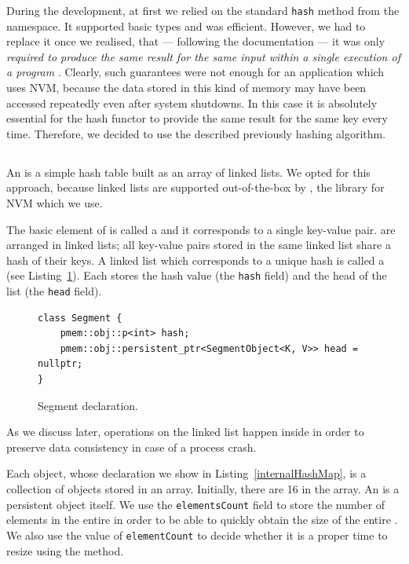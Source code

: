     During the development, at first we relied on the standard \texttt{hash} method from the \std namespace. It supported basic \std types and was efficient.
    However, we had to replace it once we realised, that --- following the documentation --- it was only \textit{required to produce the same result for the same input within a single execution of a program} \cite{StdHash}.
    Clearly, such guarantees were not enough for an application which uses NVM, because the data stored in this kind of memory may have been accessed repeatedly even after system shutdowns. In this case it is absolutely essential for the hash functor to provide the same result for the same key every time.    
    Therefore, we decided to use the described previously hashing algorithm.

\subsection{\internalHashMap}

    An \internalHashMap is a simple hash table built as an array of linked lists.
    We opted for this approach, because linked lists are supported out-of-the-box by \libpmemobj, the library for NVM which we use. 
    
    The basic element of \internalHashMap is called a \SegmentObject and it corresponds to a single key-value pair. \SegmentObjects are arranged in linked lists; all key-value pairs stored in the same linked list share a hash of their keys. A linked list which corresponds to a unique hash is called a \Segment (see Listing~\ref{Segment}). Each \Segment stores the hash value (the \texttt{hash} field) and the head of the list (the \texttt{head} field).

\begin{figure}[ht]
\renewcommand{\figurename}{Listing}
\begin{lstlisting}
class Segment {
    pmem::obj::p<int> hash;
    pmem::obj::persistent_ptr<SegmentObject<K, V>> head = nullptr;
}
\end{lstlisting}
\caption{Segment declaration.}
\label{Segment}
\end{figure}

    As we discuss later, operations on the linked list happen inside \pmdktransactions in order to preserve data consistency in case of a process crash.
    
    Each \internalHashMap object, whose declaration we show in Listing~\ref{internalHashMap}, is a collection of \Segment objects stored in an array. Initially, there are 16 \Segments in the \segments array. An \internalHashMap is a persistent object itself. We use the \texttt{elementsCount} field to store the number of elements in the entire \internalHashMap in order to be able to quickly obtain the size of the entire \NvmHashMap. We also use the value of \texttt{elementCount} to decide whether it is a proper time to resize \internalHashMap using the \expandMethod method.

